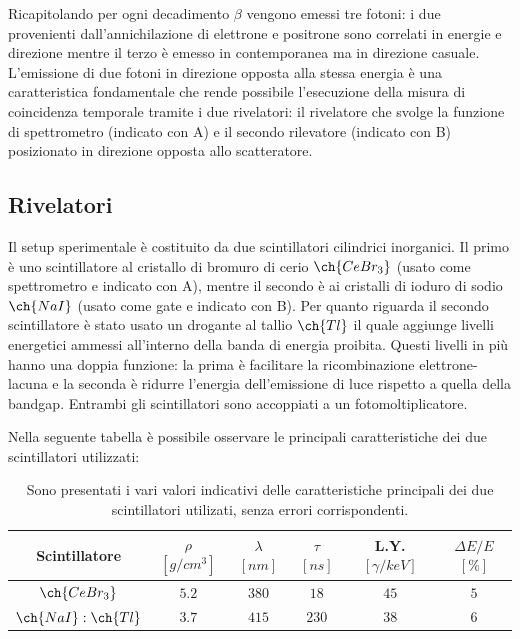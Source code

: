 Ricapitolando per ogni decadimento $\beta$ vengono emessi tre fotoni: i due provenienti dall'annichilazione di elettrone e positrone sono correlati in energie e direzione mentre il terzo è emesso in contemporanea ma in direzione casuale. L'emissione di due fotoni in direzione opposta alla stessa energia è una caratteristica fondamentale che rende possibile l'esecuzione della misura di coincidenza temporale tramite i due rivelatori: il rivelatore che svolge la funzione di spettrometro (indicato con A) e il secondo rilevatore (indicato con B) posizionato in direzione opposta allo scatteratore. 
\subsection{Rivelatori}
Il setup sperimentale è costituito da due scintillatori cilindrici inorganici. Il primo è uno scintillatore al cristallo di bromuro di cerio $\ch{CeBr_3}$ (usato come spettrometro e indicato con A), mentre il secondo è ai cristalli di ioduro di sodio $\ch{NaI}$ (usato come gate e indicato con B). Per quanto riguarda il secondo scintillatore è stato usato un drogante al tallio $\ch{Tl}$ il quale aggiunge livelli energetici ammessi all'interno della banda di energia proibita. Questi livelli in più hanno una doppia funzione: la prima è facilitare la ricombinazione elettrone-lacuna e la seconda è ridurre l'energia dell'emissione di luce rispetto a quella della bandgap. Entrambi gli scintillatori sono accoppiati a un fotomoltiplicatore.

Nella seguente tabella è possibile osservare le principali caratteristiche dei due scintillatori utilizzati:
\begin{table}[H]
    \centering
    \begin{tabular}{|c|c|c|c|c|c|}
    \hline
       Scintillatore  & $\rho$ $[\unit{g}/\unit{cm^3}]$ & $\lambda$ $[\unit{nm}]$ & $\tau$ $[\unit{ns}]$ & L.Y. $[\gamma/\unit{keV}]$ & $\Delta E/E$ $[\%]$ \\
    \hline
    \hline
    $\ch{CeBr_3}$ & $5.2$ & $380$ & $18$ & $45$ & $5$ \\
    \hline
    $\ch{NaI}:\ch{Tl}$ & $3.7$ & $415$ & $230$ & $38$ & $6$ \\
    \hline
    \end{tabular}
    \caption{Sono presentati i vari valori indicativi delle caratteristiche principali dei due scintillatori utilizati, senza errori corrispondenti.}
    \label{tab:scintillatori}
\end{table}

